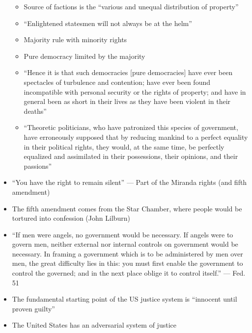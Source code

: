 \documentclass[12pt]{article}
\begin{document}
\begin{itemize}
\begin{itemize}
      \item Source of factions is the “various and unequal distribution of property”

      \item “Enlightened statesmen will not always be at the helm”

      \item Majority rule with minority rights

      \item Pure democracy limited by the majority

      \item “Hence it is that such democracies [pure democracies] have ever been spectacles of turbulence and contention; have ever been found incompatible with personal security or the rights of property; and have in general been as short in their lives as they have been violent in their deaths”

      \item “Theoretic politicians, who have patronized this species of government, have erroneously supposed that by reducing mankind to a perfect equality in their political rights, they would, at the same time, be perfectly equalized and assimilated in their possessions, their opinions, and their passions”

    \end{itemize}

  \item “You have the right to remain silent” — Part of the Miranda rights (and fifth amendment)

  \item The fifth amendment comes from the Star Chamber, where people would be tortured into confession (John Lilburn)

  \item “If men were angels, no government would be necessary. If angels were to govern men, neither external nor internal controls on government would be necessary. In framing a government which is to be administered by men over men, the great difficulty lies in this: you must first enable the government to control the governed; and in the next place oblige it to control itself.” — Fed. 51

  \item The fundamental starting point of the US justice system is “innocent until proven guilty”

  \item The United States has an adversarial system of justice

\end{itemize}
\end{document}
